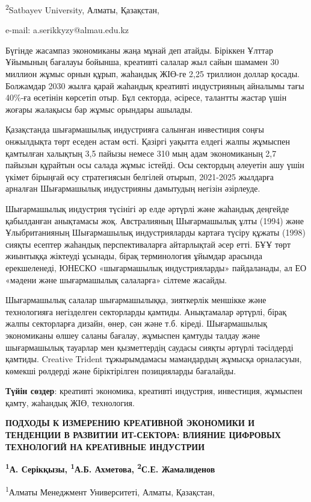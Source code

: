 \textsuperscript{2}Satbayev University, Алматы, Қазақстан,

e-mail: a.serikkyzy@almau.edu.kz

Бүгінде жасампаз экономиканы жаңа мұнай деп атайды. Біріккен Ұлттар
Ұйымының бағалауы бойынша, креативті салалар жыл сайын шамамен 30
миллион жұмыс орнын құрып, жаһандық ЖІӨ-ге 2,25 триллион доллар қосады.
Болжамдар 2030 жылға қарай жаһандық креативті индустрияның айналымы тағы
40\%-ға өсетінін көрсетіп отыр. Бұл секторда, әсіресе, талантты жастар
үшін жоғары жалақысы бар жұмыс орындары ашылады.

Қазақстанда шығармашылық индустрияға салынған инвестиция соңғы
онжылдықта төрт еседен астам өсті. Қазіргі уақытта елдегі жалпы жұмыспен
қамтылған халықтың 3,5 пайызы немесе 310 мың адам экономиканың 2,7
пайызын құрайтын осы салада жұмыс істейді. Осы сектордың әлеуетін ашу
үшін үкімет бірыңғай өсу стратегиясын белгілей отырып, 2021-2025
жылдарға арналған Шығармашылық индустрияны дамытудың негізін әзірлеуде.

Шығармашылық индустрия түсінігі әр елде әртүрлі және жаһандық деңгейде
қабылданған анықтамасы жоқ. Австралияның Шығармашылық ұлты (1994) және
Ұлыбританияның Шығармашылық индустрияларды картаға түсіру құжаты (1998)
сияқты есептер жаһандық перспективаларға айтарлықтай әсер етті. БҰҰ төрт
жиынтыққа жіктеуді ұсынады, бірақ терминология ұйымдар арасында
ерекшеленеді, ЮНЕСКО «шығармашылық индустрияларды» пайдаланады, ал ЕО
«мәдени және шығармашылық салаларға» сілтеме жасайды.

Шығармашылық салалар шығармашылыққа, зияткерлік меншікке және
технологияға негізделген секторларды қамтиды. Анықтамалар әртүрлі, бірақ
жалпы секторларға дизайн, өнер, сән және т.б. кіреді. Шығармашылық
экономиканы өлшеу саланы бағалау, жұмыспен қамтуды талдау және
шығармашылық тауарлар мен қызметтердің саудасы сияқты әртүрлі тәсілдерді
қамтиды. Creative Trident тұжырымдамасы мамандардың жұмысқа орналасуын,
көмекші рөлдерді және біріктірілген позицияларды бағалайды.

{\bfseries Түйін сөздер}: креативті экономика, креативті индустрия,
инвестиция, жұмыспен қамту, жаһандық ЖІӨ, технология.

{\bfseries ПОДХОДЫ К ИЗМЕРЕНИЮ КРЕАТИВНОЙ ЭКОНОМИКИ И ТЕНДЕНЦИИ В РАЗВИТИИ
ИТ-СЕКТОРА: ВЛИЯНИЕ ЦИФРОВЫХ ТЕХНОЛОГИЙ НА КРЕАТИВНЫЕ ИНДУСТРИИ}

{\bfseries \textsuperscript{1}А. Серікқызы, \textsuperscript{1}А.Б.
Ахметова, \textsuperscript{2}С.Е. Жамалиденов}

\textsuperscript{1}Алматы Менеджмент Университеті, Алматы, Қазақстан,


